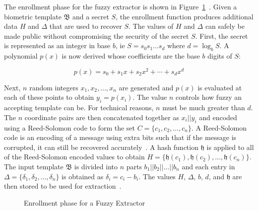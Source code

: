 \documentclass[11pt]{article}
\begin{document}
The enrollment phase for the fuzzy extractor is shown in Figure~\ref{fig:enroll}~\cite{conf/csreaSAM/AlvarezEA09}. Given a biometric template $\mathfrak{B}$ and a secret $S$, the enrollment function produces additional data $H$ and $\Delta$ that are used to recover $S$. The values of $H$ and $\Delta$ can safely be made public without compromising the security of the secret $S$. First, the secret is represented as an integer in base $b$, ie $S = s_0s_1\ldots s_d$ where $d = \log_b S$. A polynomial $p(x)$ is now derived whose coefficients are the base $b$ digits of $S$:

$$p(x) = s_0 + s_1x + s_2x^2 + \cdots + s_dx^d$$

Next, $n$ random integers $x_1, x_2, \ldots, x_n$ are generated and $p(x)$ is evaluated at each of these points to obtain $y_i = p(x_i)$. The value $n$ controls how fuzzy an accepting template can be. For technical reasons, $n$ must be much greater than $d$. The $n$ coordinate pairs are then concatenated together as $x_i||y_i$ and encoded using a Reed-Solomon code to form the set $C = \{c_1, c_2,\ldots, c_n\}$. A Reed-Solomon code is an encoding of a message using extra bits such that if the message is corrupted, it can still be recovered accurately~\cite{reed60polynomial}. A hash function $\mathfrak{h}$ is applied to all of the Reed-Solomon encoded values to obtain $H = \{\mathfrak h(c_1), \mathfrak h(c_2), \ldots, \mathfrak h(c_n)\}$. The input template $\mathfrak B$ is divided into $n$ parts $b_1||b_2||\ldots||b_n$ and each entry in $\Delta = \{\delta_1, \delta_2, \ldots, \delta_n\}$ is obtained as $\delta_i = c_i - b_i$. The values $H$, $\Delta$, $b$, $d$, and $\mathfrak h$ are then stored to be used for extraction~\cite{conf/csreaSAM/AlvarezEA09}.

\begin{figure}[h!]
\centering
{}
\caption{Enrollment phase for a Fuzzy Extractor}
\label{fig:enroll}
\end{figure}
\end{document}
